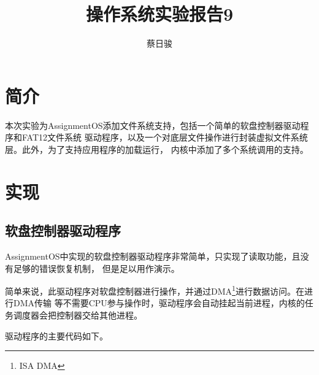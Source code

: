 \documentclass[a4paper, adobefonts]{ctexart}
\title{操作系统实验报告9}
\author{蔡日骏\quad12348003}
\begin{document}
\maketitle

\section{简介}
本次实验为AssignmentOS添加文件系统支持，包括一个简单的软盘控制器驱动程序和FAT12文件系统
驱动程序，以及一个对底层文件操作进行封装虚拟文件系统层。此外，为了支持应用程序的加载运行，
内核中添加了多个系统调用的支持。

\section{实现}
\subsection{软盘控制器驱动程序}
AssignmentOS中实现的软盘控制器驱动程序非常简单，只实现了读取功能，且没有足够的错误恢复机制，
但是足以用作演示。

简单来说，此驱动程序对软盘控制器进行操作，并通过DMA\footnote{ISA DMA}进行数据访问。在进行DMA传输
等不需要CPU参与操作时，驱动程序会自动挂起当前进程，内核的任务调度器会把控制器交给其他进程。

驱动程序的主要代码如下。
\end{document}
